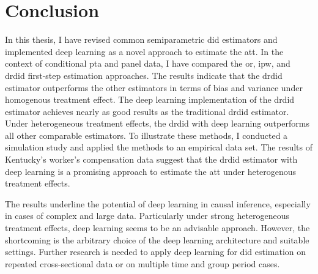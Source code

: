 \section{Conclusion}

In this thesis, I have revised common semiparametric \ac{did} estimators and implemented deep learning as a novel approach to estimate the \ac{att}.
In the context of conditional \ac{pta} and panel data, I have compared the \ac{or}, \ac{ipw}, and \ac{drdid} first-step estimation approaches.
The results indicate that the \ac{drdid} estimator outperforms the other estimators in terms of bias and variance under homogenous treatment effect.
The deep learning implementation of the \ac{drdid} estimator achieves nearly as good results as the traditional \ac{drdid} estimator.
Under heterogeneous treatment effects, the \ac{drdid} with deep learning outperforms all other comparable estimators.
To illustrate these methods, I conducted a simulation study and applied the methods to an empirical data set.
The results of Kentucky's worker's compensation data suggest that the \ac{drdid} estimator with deep learning is a promising approach to estimate the \ac{att} under heterogenous treatment effects.

The results underline the potential of deep learning in causal inference, especially in cases of complex and large data.
Particularly under strong heterogeneous treatment effects, deep learning seems to be an advisable approach.
However, the shortcoming is the arbitrary choice of the deep learning architecture and suitable settings.
Further research is needed to apply deep learning for \ac{did} estimation on repeated cross-sectional data or on multiple time and group period cases.
